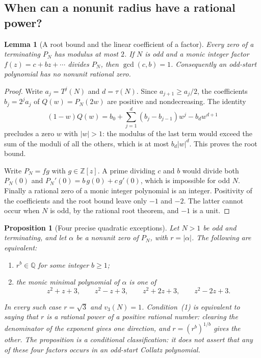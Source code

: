 \documentclass[11pt,a4paper]{article}
\newtheorem{lemma}[theorem]{Lemma}
\newtheorem{proposition}[theorem]{Proposition}
\theoremstyle{definition}
\theoremstyle{remark}
\numberwithin{equation}{section}
\begin{document}
\subsection{When can a nonunit radius have a rational power?}

\begin{lemma}[A root bound and the linear coefficient of a factor]
\label{C:lem:joint-small-degree}
Every zero of a terminating $P_N$ has modulus at most $2$.
If $N$ is odd and a monic integer factor
$f(z)=c+bz+\cdots$ divides $P_N$, then $\gcd(c,b)=1$.
Consequently an odd-start polynomial has no nonunit rational zero.
\end{lemma}

\begin{proof}
Write $a_j=T^j(N)$ and $d=\tau(N)$.
Since $a_{j+1}\ge a_j/2$, the coefficients $b_j=2^ja_j$ of
$Q(w)=P_N(2w)$ are positive and nondecreasing.
The identity
\[
 (1-w)Q(w)=b_0+\sum_{j=1}^d(b_j-b_{j-1})w^j-b_dw^{d+1}
\]
precludes a zero $w$ with $|w|>1$:
the modulus of the last term would exceed the sum of the moduli
of all the others, which is at most $b_d|w|^d$.
This proves the root bound.

Write $P_N=fg$ with $g\in\mathbb Z[z]$.
A prime dividing $c$ and $b$ would divide both $P_N(0)$ and
$P_N'(0)=b\,g(0)+c\,g'(0)$, which is impossible for odd $N$.
Finally a rational zero of a monic integer polynomial is an integer.
Positivity of the coefficients and the root bound leave only $-1$
and $-2$.  The latter cannot occur when $N$ is odd, by the rational
root theorem, and $-1$ is a unit.
\end{proof}

\begin{proposition}[Four precise quadratic exceptions]
\label{C:prop:joint-rational-power-exceptions}
Let $N>1$ be odd and terminating, and let $\alpha$ be a nonunit
zero of $P_N$, with $r=|\alpha|$.
The following are equivalent:
\begin{enumerate}
\item $r^b\in\mathbb Q$ for some integer $b\ge1$;
\item the monic minimal polynomial of $\alpha$ is one of
\[
 z^2+z+3,\qquad z^2-z+3,\qquad
 z^2+2z+3,\qquad z^2-2z+3.
\]
\end{enumerate}
In every such case $r=\sqrt3$ and $v_3(N)=1$.
Condition~(1) is equivalent to saying that $r$ is a rational power
of a positive rational number: clearing the denominator of the
exponent gives one direction, and $r=(r^b)^{1/b}$ gives the other.
The proposition is a conditional classification: it does not assert
that any of these four factors occurs in an odd-start Collatz
polynomial.
\end{proposition}
\end{document}
